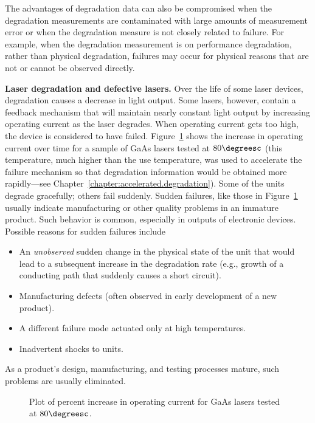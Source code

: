 The advantages of degradation data can also be compromised when the
degradation measurements are contaminated with large amounts of
measurement error or when the degradation measure is not closely
related to failure. For example, when the degradation measurement is
on performance degradation, rather than physical degradation,
failures may occur for physical reasons that are not or cannot be
observed directly.

\begin{example}{\bfseries Laser degradation and defective lasers.}
\label{example:laser.defect.deg}
Over the life of some laser devices, degradation causes a decrease
in light output. Some lasers, however, contain a feedback mechanism
that will maintain nearly constant light output by increasing operating
current as the laser degrades. When operating current gets too high,
the device is considered to have failed.
Figure~\ref{figure:laser.degradation.strate.defect.ps} shows the
increase in operating current over time for a sample of GaAs lasers
tested at $80\degreesc$ (this temperature, much higher than the use
temperature, was used to accelerate the failure mechanism so that
degradation information would be obtained more rapidly---see
Chapter~\ref{chapter:accelerated.degradation}).  Some of the units
degrade gracefully; others fail suddenly.  Sudden failures, like
those in Figure~\ref{figure:laser.degradation.strate.defect.ps}
usually indicate manufacturing or other quality problems in an
immature product. Such behavior is common, especially in outputs of
electronic devices.  Possible reasons for sudden failures include
\begin{itemize}
\item
An {\em unobserved} sudden change in the physical state of the unit
that would lead to a subsequent increase in the degradation rate
(e.g., growth of a conducting path that suddenly causes a short circuit).
\item
Manufacturing defects (often observed in early development of a new
product). 
\item
A different failure mode actuated only at high temperatures.
\item
Inadvertent shocks to units.
\end{itemize}
As a product's design, manufacturing, and testing processes mature, such
problems are usually eliminated.
\begin{figure}
\caption{Plot of percent increase in operating current for GaAs
lasers tested at $80\degreesc$.}
\label{figure:laser.degradation.strate.defect.ps}
\end{figure}
\end{example}

